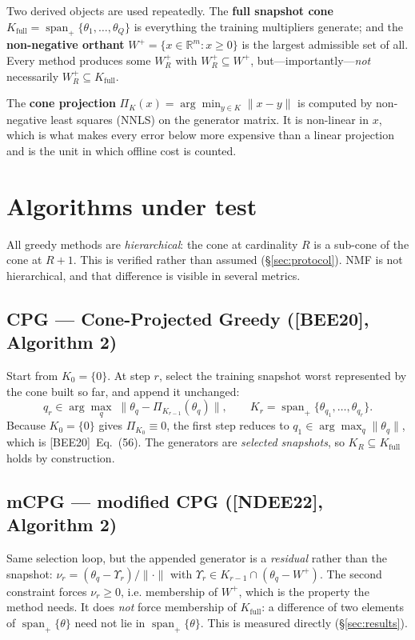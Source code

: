 \documentclass[11pt,a4paper]{article}
\newcommand{\Kfull}{K_{\mathrm{full}}}
\newcommand{\spanp}{\operatorname{span}_+}
\newcommand{\Wp}{W^{+}}
\newcommand{\R}{\mathbb{R}}
\newcommand{\bee}{\textsf{[BEE20]}}
\newcommand{\ndee}{\textsf{[NDEE22]}}
\begin{document}
Two derived objects are used repeatedly. The \textbf{full snapshot cone}
$\Kfull=\spanp\{\theta_1,\dots,\theta_Q\}$ is everything the training multipliers
generate; and the \textbf{non-negative orthant} $\Wp=\{x\in\R^m: x\ge0\}$ is the largest
admissible set of all. Every method produces some $W_R^+$ with
$W_R^+\subseteq\Wp$, but---importantly---\emph{not} necessarily $W_R^+\subseteq\Kfull$.

The \textbf{cone projection} $\Pi_K(x)=\arg\min_{y\in K}\|x-y\|$ is computed by
non-negative least squares (NNLS) on the generator matrix. It is non-linear in $x$, which
is what makes every error below more expensive than a linear projection and is the unit
in which offline cost is counted.

\section{Algorithms under test}

All greedy methods are \emph{hierarchical}: the cone at cardinality $R$ is a sub-cone of
the cone at $R+1$. This is verified rather than assumed
(\S\ref{sec:protocol}). NMF is not hierarchical, and that difference is visible in
several metrics.

\subsection{CPG --- Cone-Projected Greedy (\bee{}, Algorithm 2)}

Start from $K_0=\{0\}$. At step $r$, select the training snapshot worst represented by
the cone built so far, and append it unchanged:
\begin{equation}
q_r \in \arg\max_{q}\;\bigl\| \theta_q - \Pi_{K_{r-1}}(\theta_q)\bigr\|,
\qquad K_r = \spanp\{\theta_{q_1},\dots,\theta_{q_r}\}.
\label{eq:cpg}
\end{equation}
Because $K_0=\{0\}$ gives $\Pi_{K_0}\equiv 0$, the first step reduces to
$q_1\in\arg\max_q\|\theta_q\|$, which is \bee{}~Eq.~(56). The generators are
\emph{selected snapshots}, so $K_R\subseteq\Kfull$ holds by construction.

\subsection{mCPG --- modified CPG (\ndee{}, Algorithm 2)}

Same selection loop, but the appended generator is a \emph{residual} rather than the
snapshot: $\nu_r = (\theta_q-\Upsilon_r)/\|\cdot\|$ with
$\Upsilon_r\in K_{r-1}\cap(\theta_q-\Wp)$. The second constraint forces $\nu_r\ge0$, i.e.
membership of $\Wp$, which is the property the method needs. It does \emph{not} force
membership of $\Kfull$: a difference of two elements of $\spanp\{\theta\}$ need not lie
in $\spanp\{\theta\}$. This is measured directly (\S\ref{sec:results}).
\end{document}
